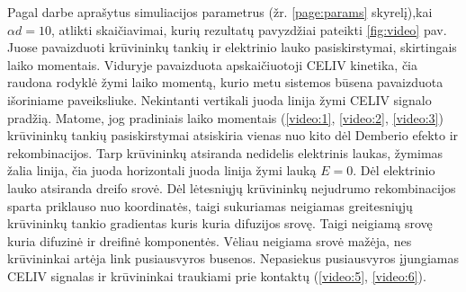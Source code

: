 Pagal darbe aprašytus simuliacijos parametrus (žr. \ref{page:params} skyrelį),kai $\alpha d = 10$, atlikti skaičiavimai, kurių rezultatų pavyzdžiai pateikti \ref{fig:video} pav.
Juose pavaizduoti krūvininkų tankių ir elektrinio lauko pasiskirstymai, skirtingais laiko momentais. Viduryje pavaizduota apskaičiuotoji CELIV kinetika, čia raudona rodyklė žymi laiko momentą, kurio metu sistemos būsena pavaizduota išoriniame paveiksliuke. Nekintanti vertikali juoda linija žymi CELIV signalo pradžią.
Matome, jog pradiniais laiko momentais (\ref{video:1}, \ref{video:2}, \ref{video:3}) krūvininkų tankių pasiskirstymai atsiskiria vienas nuo kito dėl Demberio efekto ir rekombinacijos. Tarp krūvininkų atsiranda nedidelis elektrinis laukas, žymimas žalia linija, čia juoda horizontali juoda linija žymi lauką $E=0$. Dėl elektrinio lauko atsiranda dreifo srovė. Dėl lėtesniųjų krūvininkų nejudrumo rekombinacijos sparta priklauso nuo koordinatės, taigi sukuriamas neigiamas greitesniųjų krūvininkų tankio gradientas kuris kuria difuzijos srovę. Taigi neigiamą srovę kuria difuzinė ir dreifinė komponentės. Vėliau neigiama srovė mažėja, nes krūvininkai artėja link pusiausvyros busenos. Nepasiekus pusiausvyros įjungiamas CELIV signalas ir krūvininkai traukiami prie kontaktų (\ref{video:5}, \ref{video:6}).